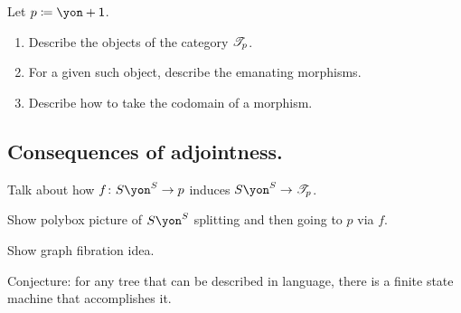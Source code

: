 \documentclass[DynamicalBook]{subfiles}
\begin{document}
\begin{exercise}
Let $p\coloneqq \yon+\1$.
\begin{enumerate}
	\item Describe the objects of the category $\mathscr{T}_{p}$.
	\item For a given such object, describe the emanating morphisms.
	\item Describe how to take the codomain of a morphism.
\qedhere
\end{enumerate}
\end{exercise}




\subsection{Consequences of adjointness.}

Talk about how $f\colon S\yon^S\to p$ induces $S\yon^S\to\cofree{p}$.

Show polybox picture of $S\yon^S$ splitting and then going to $p$ via $f$.

Show graph fibration idea.

Conjecture: for any tree that can be described in language, there is a finite state machine that accomplishes it.
\end{document}
